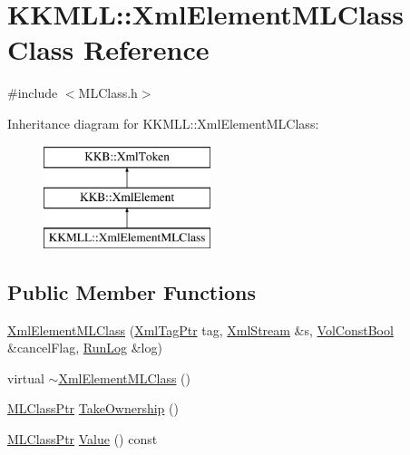 \hypertarget{class_k_k_m_l_l_1_1_xml_element_m_l_class}{}\section{K\+K\+M\+LL\+:\+:Xml\+Element\+M\+L\+Class Class Reference}
\label{class_k_k_m_l_l_1_1_xml_element_m_l_class}


{\ttfamily \#include $<$M\+L\+Class.\+h$>$}

Inheritance diagram for K\+K\+M\+LL\+:\+:Xml\+Element\+M\+L\+Class\+:\begin{figure}[H]
\begin{center}
\leavevmode
\includegraphics[height=3.000000cm]{class_k_k_m_l_l_1_1_xml_element_m_l_class}
\end{center}
\end{figure}
\subsection*{Public Member Functions}
\begin{DoxyCompactItemize}
\item 
\hyperlink{class_k_k_m_l_l_1_1_xml_element_m_l_class_a713944ab38a258e18a937b71cb34ca88}{Xml\+Element\+M\+L\+Class} (\hyperlink{namespace_k_k_b_a9253a3ea8a5da18ca82be4ca2b390ef0}{Xml\+Tag\+Ptr} tag, \hyperlink{class_k_k_b_1_1_xml_stream}{Xml\+Stream} \&s, \hyperlink{namespace_k_k_b_a7d390f568e2831fb76b86b56c87bf92f}{Vol\+Const\+Bool} \&cancel\+Flag, \hyperlink{class_k_k_b_1_1_run_log}{Run\+Log} \&log)
\item 
virtual \hyperlink{class_k_k_m_l_l_1_1_xml_element_m_l_class_adf84f4e5afac791f1c8476a0727cfe3d}{$\sim$\+Xml\+Element\+M\+L\+Class} ()
\item 
\hyperlink{namespace_k_k_m_l_l_ac272393853d59e72e8456f14cd6d8c23}{M\+L\+Class\+Ptr} \hyperlink{class_k_k_m_l_l_1_1_xml_element_m_l_class_ab4b3c8d1ff39872e01563157db99ef6d}{Take\+Ownership} ()
\item 
\hyperlink{namespace_k_k_m_l_l_ac272393853d59e72e8456f14cd6d8c23}{M\+L\+Class\+Ptr} \hyperlink{class_k_k_m_l_l_1_1_xml_element_m_l_class_a482a8a5b93cc6c61ede11c9efcee0e62}{Value} () const 
\end{DoxyCompactItemize}
